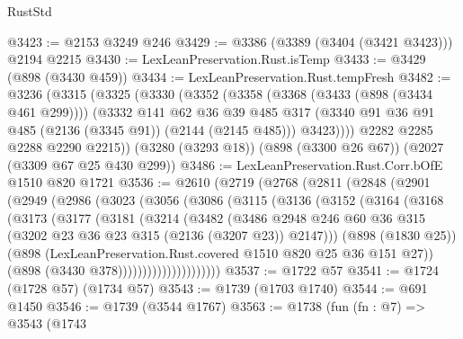\begin{lexlean}{RustStd}
\begin{coremodule}
@3423 := @2153 @3249 @246
@3429 := @3386 (@3389 (@3404 (@3421 @3423))) @2194 @2215
@3430 := LexLeanPreservation.Rust.isTemp
@3433 := @3429 (@898 (@3430 @459))
@3434 := LexLeanPreservation.Rust.tempFresh
@3482 := @3236
    (@3315
      (@3325
        (@3330
          (@3352
            (@3358
              (@3368 (@3433 (@898 (@3434 @461 @299))))
              (@3332
                @141
                @62
                @36
                @39
                @485
                @317
                (@3340 @91 @36 @91 @485 (@2136 (@3345 @91)) (@2144 (@2145 @485)))
                @3423))))
        @2282
        @2285
        @2288
        @2290
        @2215))
    (@3280 (@3293 @18))
    (@898 (@3300 @26 @67))
    (@2027 (@3309 @67 @25 @430 @299))
@3486 := LexLeanPreservation.Rust.Corr.bOfE @1510 @820 @1721
@3536 := @2610
    (@2719
      (@2768
        (@2811
          (@2848
            (@2901
              (@2949
                (@2986
                  (@3023
                    (@3056
                      (@3086
                        (@3115
                          (@3136
                            (@3152
                              (@3164
                                (@3168
                                  (@3173
                                    (@3177
                                      (@3181
                                        (@3214
                                          (@3482
                                            (@3486
                                              @2948
                                              @246
                                              @60
                                              @36
                                              @315
                                              (@3202 @23 @36 @23 @315 (@2136 (@3207 @23)) @2147)))
                                          (@898 (@1830 @25))
                                          (@898
                                            (LexLeanPreservation.Rust.covered
                                              @1510
                                              @820
                                              @25
                                              @36
                                              @151
                                              @27))
                                          (@898 (@3430 @378)))))))))))))))))))))
@3537 := @1722 @57
@3541 := @1724 (@1728 @57) (@1734 @57)
@3543 := @1739 (@1703 @1740)
@3544 := @691 @1450
@3546 := @1739 (@3544 @1767)
@3563 := @1738
    (fun (fn : @7) =>
    @3543
      (@1743

\end{coremodule}
\end{lexlean}
